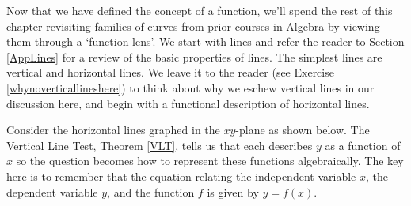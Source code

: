 \documentclass{ximera}
\begin{document}
	\author{Stitz-Zeager}
\begin{abstract}
\end{abstract}
\label{ConstantFunctions}


Now that we have defined the concept of a function, we'll spend the rest of this chapter revisiting families of curves from prior courses in Algebra by viewing them through a `function lens'.  We start with lines and refer the reader to Section \ref{AppLines} for a review of the basic properties of lines.  The simplest lines are vertical and horizontal lines.  We leave it to the reader (see Exercise \ref{whynoverticallineshere}) to think about why we eschew vertical lines in our discussion here, and begin with a functional description of horizontal lines.  

Consider the horizontal lines graphed in the $xy$-plane as shown below. The Vertical Line Test, Theorem \ref{VLT}, tells us that each describes $y$ as a function of $x$ so the question becomes how to represent these functions algebraically. The key here is to remember that the equation relating the independent variable $x$,  the dependent variable  $y$, and the function $f$ is given by $y = f(x)$.
\end{document}
